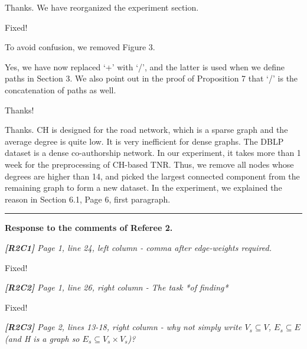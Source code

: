 \documentclass[11pt]{letter}
\newcommand{\vs}{\vspace{1ex}}
\newcommand{\svs}{\vspace{0.36ex}}
\begin{document}
\svs

Thanks. We have reorganized the experiment section.



\svs
Fixed!


\svs
To avoid confusion, we removed Figure 3.


\svs
Yes, we have now replaced `+' with `/', and the latter is used when we define paths in Section 3.
We also point out in the proof of Proposition 7 that `/' is the concatenation of paths as well.

Thanks!


\svs
Thanks. CH is designed for the road network, which is a sparse graph and the average degree is quite low. It is very inefficient for dense graphs. The DBLP dataset is a dense co-authorship network. In our experiment, it takes more than 1 week for the preprocessing of CH-based TNR. Thus, we remove all nodes whose degrees are higher than 14, and picked the largest connected component from the remaining graph to form a new dataset. In the experiment, we explained the reason in Section 6.1, Page 6, first paragraph.





\vspace{2.8ex}
\hrule
\vspace{0.6ex}
{\bf Response to the comments of Referee 2.}



\vs
\noindent
{\em
{\bf [R2C1]}
 Page 1, line 24, left column - comma after edge-weights required.}
\svs

Fixed!

\vs
\noindent
{\em
{\bf [R2C2]} Page 1, line 26, right column - The task *of finding*}
\svs

Fixed!

\vs
\noindent
{\em
{\bf [R2C3]} Page 2, lines 13-18, right column - why not simply write $V_s \subseteq V$, $E_s \subseteq E$ (and H is a graph so $E_s \subseteq V_s \times V_s$)?
}
\svs
\end{document}
